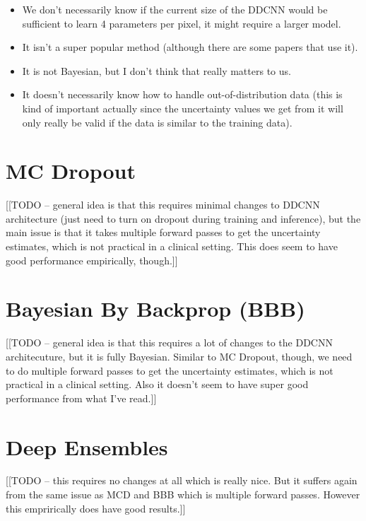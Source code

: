 \documentclass{article}
\newcommand{\0}{\varnothing}
\theoremstyle{definition}
\begin{document}
\begin{itemize}
  \item We don't necessarily know if the current size of the DDCNN would be sufficient to learn 4 parameters per pixel, it might require a larger model.
  \item It isn't a super popular method (although there are some papers that use it).
  \item It is not Bayesian, but I don't think that really matters to us.
  \item It doesn't necessarily know how to handle out-of-distribution data (this is kind of important actually since the uncertainty values we get from it will only really be valid if the data is similar to the training data).
\end{itemize}

\section{MC Dropout}

[[TODO -- general idea is that this requires minimal changes to DDCNN architecture (just need to turn on dropout during training and inference), but the main issue is that it takes multiple forward passes to get the uncertainty estimates, which is not practical in a clinical setting. This does seem to have good performance empirically, though.]]

\section{Bayesian By Backprop (BBB)}

[[TODO -- general idea is that this requires a lot of changes to the DDCNN architecuture, but it is fully Bayesian. Similar to MC Dropout, though, we need to do multiple forward passes to get the uncertainty estimates, which is not practical in a clinical setting. Also it doesn't seem to have super good performance from what I've read.]]

\section{Deep Ensembles}

[[TODO -- this requires no changes at all which is really nice. But it suffers again from the same issue as MCD and BBB which is multiple forward passes. However this emprirically does have good results.]]



\end{document}
